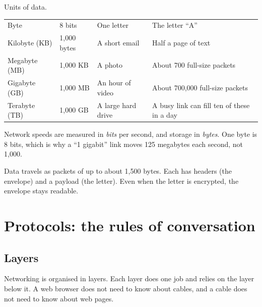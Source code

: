 \begin{gtable}{Units of data.}
\begin{tabularx}{\linewidth}{lll L}
\toprule
{} &  &  & \\
\midrule
Byte & 8 bits & One letter & The letter ``A''\\
Kilobyte (KB) & 1,000 bytes & A short email & Half a page of text\\
Megabyte (MB) & 1,000 KB & A photo & About 700 full-size packets\\
Gigabyte (GB) & 1,000 MB & An hour of video & About 700,000 full-size packets\\
Terabyte (TB) & 1,000 GB & A large hard drive & A busy link can fill ten of these in a day\\
\bottomrule
\end{tabularx}
\end{gtable}

Network speeds are measured in \emph{bits} per second, and storage in \emph{bytes}. One byte is 8 bits, which is why a ``1 gigabit'' link moves 125 megabytes each second, not 1,000.

\begin{recap}
Data travels as packets of up to about 1,500 bytes. Each has headers (the envelope) and a payload (the letter). Even when the letter is encrypted, the envelope stays readable.
\end{recap}

\chapter{Protocols: the rules of conversation}

\section{Layers}
Networking is organised in layers. Each layer does one job and relies on the layer below it. A web browser does not need to know about cables, and a cable does not need to know about web pages.


